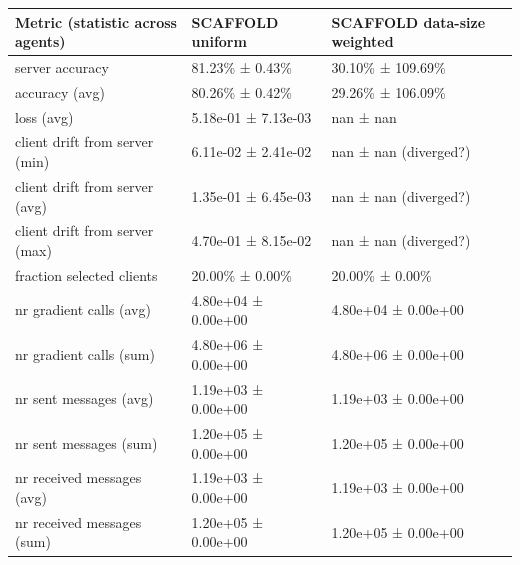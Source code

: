 \begin{tabular}{lll}
\hline
 Metric (statistic across agents)   & SCAFFOLD uniform    & SCAFFOLD data-size weighted   \\
\hline
 server accuracy                    & 81.23\% ± 0.43\%      & 30.10\% ± 109.69\%              \\
 accuracy (avg)                     & 80.26\% ± 0.42\%      & 29.26\% ± 106.09\%              \\
 loss (avg)                         & 5.18e-01 ± 7.13e-03 & nan ± nan                     \\
 client drift from server (min)     & 6.11e-02 ± 2.41e-02 & nan ± nan (diverged?)         \\
 client drift from server (avg)     & 1.35e-01 ± 6.45e-03 & nan ± nan (diverged?)         \\
 client drift from server (max)     & 4.70e-01 ± 8.15e-02 & nan ± nan (diverged?)         \\
 fraction selected clients          & 20.00\% ± 0.00\%      & 20.00\% ± 0.00\%                \\
 nr gradient calls (avg)            & 4.80e+04 ± 0.00e+00 & 4.80e+04 ± 0.00e+00           \\
 nr gradient calls (sum)            & 4.80e+06 ± 0.00e+00 & 4.80e+06 ± 0.00e+00           \\
 nr sent messages (avg)             & 1.19e+03 ± 0.00e+00 & 1.19e+03 ± 0.00e+00           \\
 nr sent messages (sum)             & 1.20e+05 ± 0.00e+00 & 1.20e+05 ± 0.00e+00           \\
 nr received messages (avg)         & 1.19e+03 ± 0.00e+00 & 1.19e+03 ± 0.00e+00           \\
 nr received messages (sum)         & 1.20e+05 ± 0.00e+00 & 1.20e+05 ± 0.00e+00           \\
\hline
\end{tabular}